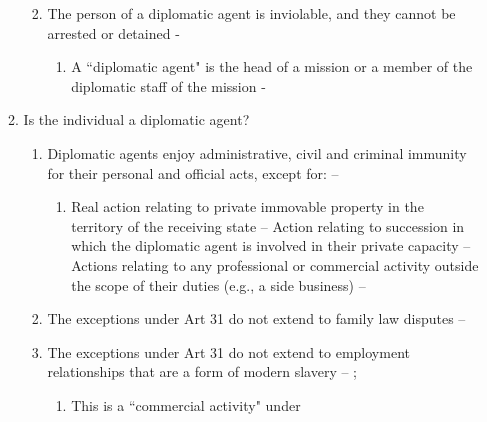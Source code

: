 \begin{enumerate}
\begin{enumerate}
\begin{enumerate}
\begin{enumerate}
            \end{enumerate}
            \item The person of a diplomatic agent is inviolable, and they cannot be arrested or detained - 
            \begin{enumerate}
                \item A ``diplomatic agent" is the head of a mission or a member of the diplomatic staff of the mission - 
            \end{enumerate}
        \end{enumerate}
        \item Is the individual a diplomatic agent?
        \begin{enumerate}
            \item Diplomatic agents enjoy administrative, civil and criminal immunity for their personal and official acts, except for: -- 
            \begin{enumerate}
                \item Real action relating to private immovable property in the territory of the receiving state -- 
                Action relating to succession in which the diplomatic agent is involved in their private capacity -- 
                Actions relating to any professional or commercial activity outside the scope of their duties (e.g., a side business) -- 
            \end{enumerate}
            \item The exceptions under Art 31 do not extend to family law disputes -- 
            \item The exceptions under Art 31 do not extend to employment relationships that are a form of modern slavery -- ; 
            \begin{enumerate}
                \item This is a ``commercial activity" under 

\end{enumerate}
\end{enumerate}
\end{enumerate}
\end{enumerate}
